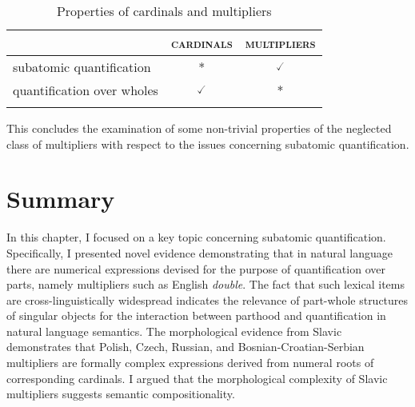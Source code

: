     \begin{table}[h]
    \centering
\begin{tabular}{lcc}
\lsptoprule
                           & \textsc{cardinals} & \textsc{multipliers}  \\ \midrule
subatomic quantification   & *               & $\checked$    \\
quantification over wholes & $\checked$               & *    \\ \lspbottomrule
\end{tabular}
\caption{Properties of cardinals and multipliers}
\label{tab:properties-of-cardinals-and-multipliers}
\end{table}

This concludes the examination of some non-trivial properties of the neglected class of multipliers with respect to the issues concerning subatomic quantification. 

\section{Summary}\label{sec:summary-ch4}

In this chapter, I focused on a key topic concerning subatomic quantification. Specifically, I presented novel evidence demonstrating that in natural language there are numerical expressions devised for the purpose of quantification over parts, namely multipliers such as English \textit{double}. The fact that such lexical items are cross-linguistically widespread indicates the relevance of part-whole structures of singular objects for the interaction between parthood and quantification in natural language semantics. The morphological evidence from Slavic demonstrates that Polish, Czech, Russian, and Bosnian-Croatian-Serbian multipliers are formally complex expressions derived from numeral roots of corresponding cardinals. I argued that the morphological complexity of Slavic multipliers suggests semantic compositionality. 

